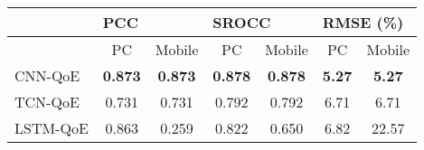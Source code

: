   \begin{tabular}{|l|c|c|c|c|c|c|}
    \hline
    & \multicolumn{2}{l|}{PCC} & \multicolumn{2}{l|}{SROCC} & \multicolumn{2}{l|}{RMSE (\%)} \\ \hline
    & PC & Mobile & PC & Mobile & PC & Mobile \\ \hline
    CNN-QoE    & \textbf{0.873} & \textbf{0.873} & \textbf{0.878} & \textbf{0.878} & \textbf{5.27} & \textbf{5.27} \\ \hline
    TCN-QoE & 0.731 & 0.731 & 0.792 & 0.792 & 6.71 & 6.71 \\ \hline
    LSTM-QoE \cite{QoEModel_LSTM} & 0.863 & 0.259 & 0.822 & 0.650 & 6.82 & 22.57 \\ \hline
  \end{tabular}
